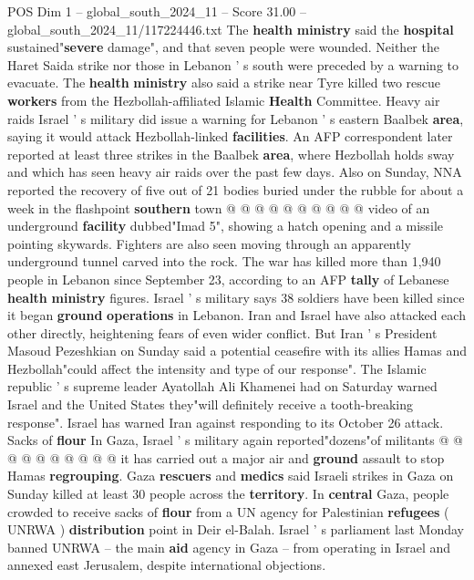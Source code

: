 \begin{textsample}{POS Dim 1 – global\_south\_2024\_11 – Score 31.00 – global\_south\_2024\_11/117224446.txt}
The \textbf{health} \textbf{ministry} said the \textbf{hospital} sustained"\textbf{severe} damage", and that seven people were wounded.
Neither the Haret Saida strike nor those in Lebanon ' s south were preceded by a warning to evacuate.
The \textbf{health} \textbf{ministry} also said a strike near Tyre killed two rescue \textbf{workers} from the Hezbollah-affiliated Islamic \textbf{Health} Committee.
Heavy air raids Israel ' s military did issue a warning for Lebanon ' s eastern Baalbek \textbf{area}, saying it would attack Hezbollah-linked \textbf{facilities}.
An AFP correspondent later reported at least three strikes in the Baalbek \textbf{area}, where Hezbollah holds sway and which has seen heavy air raids over the past few days.
Also on Sunday, NNA reported the recovery of five out of 21 bodies buried under the rubble for about a week in the flashpoint \textbf{southern} town @ @ @ @ @ @ @ @ @ @ video of an underground \textbf{facility} dubbed"Imad 5", showing a hatch opening and a missile pointing skywards.
Fighters are also seen moving through an apparently underground tunnel carved into the rock.
The war has killed more than 1,940 people in Lebanon since September 23, according to an AFP \textbf{tally} of Lebanese \textbf{health} \textbf{ministry} figures.
Israel ' s military says 38 soldiers have been killed since it began \textbf{ground} \textbf{operations} in Lebanon.
Iran and Israel have also attacked each other directly, heightening fears of even wider conflict.
But Iran ' s President Masoud Pezeshkian on Sunday said a potential ceasefire with its allies Hamas and Hezbollah"could affect the intensity and type of our response".
The Islamic republic ' s supreme leader Ayatollah Ali Khamenei had on Saturday warned Israel and the United States they"will definitely receive a tooth-breaking response".
Israel has warned Iran against responding to its October 26 attack.
Sacks of \textbf{flour} In Gaza, Israel ' s military again reported"dozens"of militants @ @ @ @ @ @ @ @ @ @ it has carried out a major air and \textbf{ground} assault to stop Hamas \textbf{regrouping}.
Gaza \textbf{rescuers} and \textbf{medics} said Israeli strikes in Gaza on Sunday killed at least 30 people across the \textbf{territory}.
In \textbf{central} Gaza, people crowded to receive sacks of \textbf{flour} from a UN agency for Palestinian \textbf{refugees} ( UNRWA ) \textbf{distribution} point in Deir el-Balah.
Israel ' s parliament last Monday banned UNRWA -- the main \textbf{aid} agency in Gaza -- from operating in Israel and annexed east Jerusalem, despite international objections.

\end{textsample}
